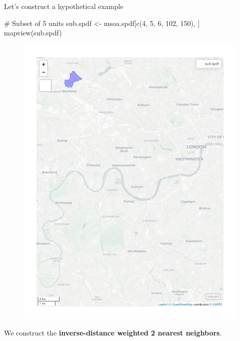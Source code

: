 \documentclass[
  letterpaper,
]{scrbook}
\newenvironment{Shaded}{\begin{snugshade}}{\end{snugshade}}
\newcommand{\CommentTok}[1]{\textcolor[rgb]{0.37,0.37,0.37}{#1}}
\newcommand{\DecValTok}[1]{\textcolor[rgb]{0.68,0.00,0.00}{#1}}
\newcommand{\FunctionTok}[1]{\textcolor[rgb]{0.28,0.35,0.67}{#1}}
\newcommand{\NormalTok}[1]{\textcolor[rgb]{0.00,0.23,0.31}{#1}}
\newcommand{\OtherTok}[1]{\textcolor[rgb]{0.00,0.23,0.31}{#1}}
\begin{document}
Let's construct a hypothetical example

\begin{Shaded}
\begin{Highlighting}[]
\CommentTok{\# Subset of 5 units}
\NormalTok{sub.spdf }\OtherTok{\textless{}{-}}\NormalTok{ msoa.spdf[}\FunctionTok{c}\NormalTok{(}\DecValTok{4}\NormalTok{, }\DecValTok{5}\NormalTok{, }\DecValTok{6}\NormalTok{, }\DecValTok{102}\NormalTok{, }\DecValTok{150}\NormalTok{), ]}
\FunctionTok{mapview}\NormalTok{(sub.spdf)}
\end{Highlighting}
\end{Shaded}

\begin{figure}[H]

{\centering \includegraphics{03_weights_files/figure-pdf/unnamed-chunk-13-1.pdf}

}

\end{figure}

We construct the \textbf{inverse-distance weighted 2 nearest neighbors}.
\end{document}

